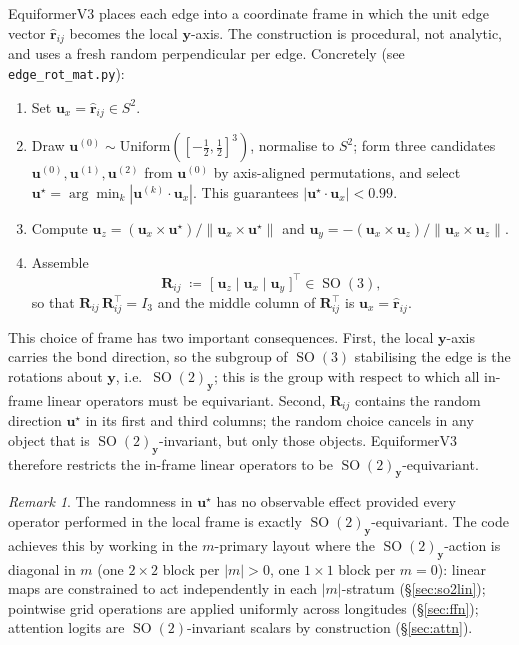 \documentclass[11pt,a4paper]{article}
\DeclareMathOperator{\SO}{SO}
\newcommand{\Sph}{S^2}
\newcommand{\bR}{\bm{R}}
\newcommand{\brh}{\hat{\bm{r}}}
\newcommand{\by}{\bm{y}}
\newcommand{\bu}{\bm{u}}
\theoremstyle{plain}
\theoremstyle{definition}
\theoremstyle{remark}
\newtheorem{remark}[theorem]{Remark}
\begin{document}
EquiformerV3 places each edge into a coordinate frame in which the unit edge
vector $\brh_{ij}$ becomes the local $\by$-axis. The construction is
procedural, not analytic, and uses a fresh random perpendicular per edge.
Concretely (see \texttt{edge\_rot\_mat.py}):

\begin{enumerate}[leftmargin=2em]
    \item Set $\bu_x=\brh_{ij}\in\Sph$.
    \item Draw $\bu^{(0)}\sim\mathrm{Uniform}([-\tfrac12,\tfrac12]^3)$, normalise to
          $\Sph$; form three candidates $\bu^{(0)},\bu^{(1)},\bu^{(2)}$ from $\bu^{(0)}$
          by axis-aligned permutations, and select
          $\bu^\star=\arg\min_{k}|\bu^{(k)}\cdot\bu_x|$. This guarantees
          $|\bu^\star\cdot\bu_x|<0.99$.
    \item Compute $\bu_z=(\bu_x\times\bu^\star)/\|\bu_x\times\bu^\star\|$ and
          $\bu_y=-(\bu_x\times\bu_z)/\|\bu_x\times\bu_z\|$.
    \item Assemble
          \begin{equation}\label{eq:edgerot}
              \bR_{ij}\;\coloneqq\;\bigl[\;\bu_z\;\big|\;\bu_x\;\big|\;\bu_y\;\bigr]^{\top}\in\SO(3),
          \end{equation}
          so that $\bR_{ij}\,\bR_{ij}^{\top}=I_3$ and the middle column of $\bR_{ij}^{\top}$ is $\bu_x=\brh_{ij}$.
\end{enumerate}

This choice of frame has two important consequences. First, the local
$\by$-axis carries the bond direction, so the subgroup of $\SO(3)$ stabilising
the edge is the rotations about $\by$, i.e.\ $\SO(2)_{\by}$; this is the group
with respect to which all in-frame linear operators must be equivariant.
Second, $\bR_{ij}$ contains the random direction $\bu^\star$ in its first and
third columns; the random choice cancels in any object that is
$\SO(2)_{\by}$-invariant, but only those objects. EquiformerV3 therefore
restricts the in-frame linear operators to be $\SO(2)_{\by}$-equivariant.

\begin{remark}\label{rmk:rand-frame}
    The randomness in $\bu^\star$ has no observable effect provided every operator performed in the local frame is exactly $\SO(2)_{\by}$-equivariant.
    The code achieves this by working in the $m$-primary layout where the $\SO(2)_{\by}$-action is diagonal in $m$ (one $2\times 2$ block per $|m|>0$, one $1\times 1$ block per $m=0$): linear maps are constrained to act independently in each $|m|$-stratum (\S\ref{sec:so2lin}); pointwise grid operations are applied uniformly across longitudes (\S\ref{sec:ffn}); attention logits are $\SO(2)$-invariant scalars by construction (\S\ref{sec:attn}).
\end{remark}
\end{document}
